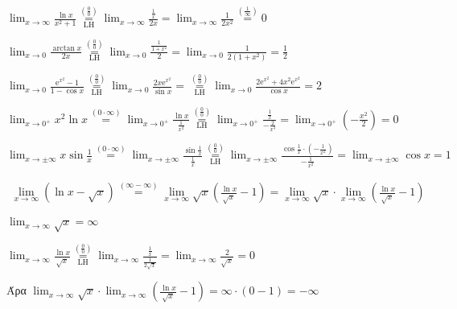 \begin{example}
  $ \lim_{x \to \infty} \frac{\ln{x}}{x^{2}+1}
  \overset{\left(\frac{0}{0}\right)}{\underset{\mathrm{LH}}{=}} \lim_{x \to
  \infty} \frac{\frac{1}{x}}{2x} = \lim_{x \to \infty} \frac{1}{2x^{2}}
  \overset{\left(\frac{1}{\infty}\right)}{=} 0 $ 
\end{example}

\begin{example}
  $ \lim_{x \to 0} \frac{\arctan{x}}{2x}
  \overset{\left(\frac{0}{0}\right)}{\underset{\mathrm{LH}}{=}} \lim_{x \to 0}
  \frac{\frac{1}{1+x^{2}}}{2} = \lim_{x \to 0} \frac{1}{2(1+x^{2})} = \frac{1}{2}
  $ 
\end{example}

\begin{example}
  $ \lim_{x \to 0} \frac{\mathrm{e}^{x^{2}} -1}{1- \cos{x}}
  \overset{\left(\frac{0}{0}\right)}{\underset{\mathrm{LH}}{=}} \lim_{x \to 0}
  \frac{2x \mathrm{e}^{x^{2}}}{\sin{x}} =
  \overset{\left(\frac{0}{0}\right)}{\underset{\mathrm{LH}}{=}} \lim_{x \to 0}
  \frac{2 \mathrm{e}^{x^{2}}+4x^{2} \mathrm{e}^{x^{2}}}{\cos{x}} = 2 $  
\end{example}

\begin{example}
  $ \lim_{x \to 0^{+}} x^{2} \ln{x} \overset{(0\cdot \infty)}{=} \lim_{x \to 0^{+}} 
  \frac{\ln{x}}{\frac{1}{x^{2}}}
  \overset{\left(\frac{0}{0}\right)}{\underset{\mathrm{LH}}{=}}
  \lim_{x \to 0^{+}} \frac{\frac{1}{x}
  }{- \frac{2}{x^{3}}} = \lim_{x \to 0^{+}} \left(-\frac{x^{2}}{2}\right) = 0 $
\end{example}

\begin{example}
  $ \lim_{x \to \pm \infty} x \sin{\frac{1}{x}} \overset{(0\cdot \infty)}{=}
  \lim_{x \to \pm \infty} \frac{\sin{\frac{1}{ x}}}{\frac{1}{x}}
  \overset{\left(\frac{0}{0}\right)}{\underset{\mathrm{LH}}{=}} \lim_{x \to \pm
  \infty} \frac{\cos{\frac{1}{x}} \cdot (- \frac{1}{x^{2}})}{- \frac{1}{x^{2}}} =
  \lim_{x \to \pm \infty} \cos{x} = 1 $
\end{example}

\begin{example}
  \begin{align*}
    \lim_{x \to \infty} (\ln{x} - \sqrt{x}) \overset{(\infty- \infty)}{=} \lim_{x \to
    \infty} \sqrt{x} \left(\frac{\ln{x}}{\sqrt{x}}-1\right) = 
    \lim_{x \to \infty} \sqrt{x} \cdot
    \lim_{x \to \infty} \left(\frac{\ln{x}}{\sqrt{x}} - 1\right)
  \end{align*}
  \begin{myitemize}
    \item $ \lim_{x \to \infty} \sqrt{x} = \infty $
    \item $ \lim_{x \to \infty} \frac{\ln{x}}{\sqrt{x}}
      \overset{\left(\frac{0}{0}\right)}{\underset{\mathrm{LH}}{=}} \lim_{x \to \infty}
      \frac{\frac{1}{x}}{\frac{1}{2 \sqrt{x}}} = \lim_{x \to \infty}
      \frac{2}{\sqrt{x}} = 0 $
  \end{myitemize}
  Άρα 
  $ \lim_{x \to \infty} \sqrt{x} \cdot \lim_{x \to \infty}
  \left(\frac{\ln{x}}{\sqrt{x}} -1\right) = \infty\cdot (0-1) = - \infty $
\end{example}

